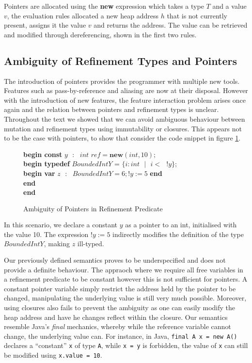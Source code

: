 \documentclass[a4paper,12pt]{report}
\newenvironment{tabs}[1]
 {\flushleft\TabPositions{#1}}
 {\endflushleft}
\begin{document}
\par
Pointers are allocated using the \textbf{new} expression which takes a type $T$ 
and a value $v$, the evaluation rules allocated a new heap address $h$ that is 
not currently present, assigns it the value $v$ and returns the address. The 
value can be retrieved and modified through dereferencing, shown in the first two 
rules. 

\subsection{Ambiguity of Refinement Types and Pointers}
The introduction of pointers provides the programmer with multiple new tools. 
Features such as pass-by-reference and aliasing are now at their disposal. 
However with the introduction of new features, the feature interaction problem 
arises once again and the relation between pointers and refinement types is 
unclear. Throughout the text we showed that we can avoid ambiguous behaviour 
between mutation and refinement types using immutability or closures. This appears 
not to be the case with pointers, to show that consider the code snippet in figure
\ref{fig:amb_refinement_pointers}. 

\begin{figure} [H]
  \begin{tabs}{1cm,2cm}
    \textbf{begin const }$y\text{ }:\text{ } int\textit{ ref} = \textbf{new}(int, 10);$\\
    \tab\textbf{begin typedef }$BoundedIntY$ = $\{i : int\text{ }|\text{ }i <\text{ }!y\}$; \\ 
    \tab\tab\textbf{begin var }$z\text{ }:\text{ }BoundedIntY = 6;!y := 5$\textbf { end} \\
    \tab\textbf {end} \\
    \textbf{end}
  \end{tabs}  
  \caption{Ambiguity of Pointers in Refinement Predicate}
  \label{fig:amb_refinement_pointers}
\end{figure}

\par
In this scenario, we declare a constant $y$ as a pointer to an int, 
initialised with the value 10. The expression $!y := 5$ indirectly modifies 
the definition of the type $BoundedIntY$, making $z$ ill-typed. 

\par
Our previously defined semantics proves to be underspecified and does not 
provide a definite behaviour. The appraoch where we require all free variables in a 
refinement predicate to be constant however this is not sufficient for pointers. 
A constant pointer variable simply restrict the address held by the pointer to be 
changed, manipulating the underlying value is still very much possible. 
Moreover, using closures also fails to prevent the ambiguity as one can easily 
modify the heap address and have he changes reflect within the closure. Our  
semantics resemble Java's \textit{final} mechanics, whereby while the reference variable 
cannot change, the underlying value can. For instance, in Java,  
\verb|final A x = new A()| declares a ``constant'' \verb|x| of type \verb|A|, while 
\verb|x = y| is forbidden, the value of \verb|x| can still be modified 
using \verb|x.value = 10|.
\end{document}
